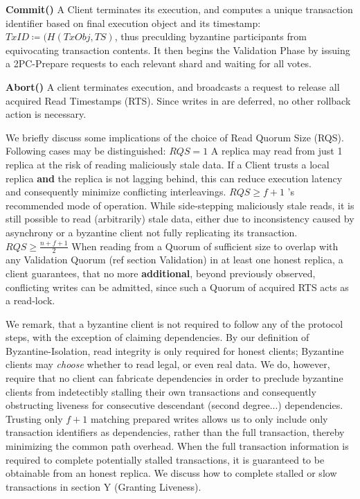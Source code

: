 \textbf{Commit()} A Client terminates its execution, and computes a unique transaction identifier based on final execution object and its timestamp: $TxID \coloneqq (H(TxObj, TS)$, thus preculding byzantine participants from equivocating transaction contents. It then begins the Validation Phase by issuing a 2PC-Prepare requests to each relevant shard and waiting for all votes.

\textbf{Abort()} A client terminates execution, and broadcasts a request to release all acquired Read Timestamps (RTS). Since writes in \sys are deferred, no other rollback action is necessary.


We briefly discuss some implications of the choice of Read Quorum Size (RQS). Following cases may be distinguished: \one \textbf{$RQS = 1$} A replica may read from just 1 replica at the risk of reading maliciously stale data. If a Client trusts a local replica \textbf{and} the replica is not lagging behind, this can reduce execution latency and consequently minimize conflicting interleavings. \two \textbf{$RQS \geq f+1$} \sys{}'s recommended mode of operation. While side-stepping maliciously stale reads, it is still possible to read (arbitrarily) stale data, either due to inconsistency caused by asynchrony or a byzantine client not fully replicating its transaction. 
\three \textbf{$RQS \geq \frac{n+f+1}{2}$} When reading from a Quorum of sufficient size to overlap with any Validation Quorum (ref section Validation) in at least one honest replica, a client guarantees, that no more \textbf{additional}, beyond previously observed, conflicting writes can be admitted, since such a Quorum of acquired RTS acts as a read-lock. 

We remark, that a byzantine client is not required to follow any of the protocol steps, with the exception of claiming dependencies. By our definition of Byzantine-Isolation, read integrity is only required for honest clients; Byzantine clients may \textit{choose} whether to read legal, or even real data. We do, however, require that no client can fabricate dependencies in order to preclude byzantine clients from indetectibly stalling their own transactions and consequently obstructing liveness for consecutive descendant (second degree...) dependencies.
Trusting only $f+1$ matching prepared writes allows us to only include only transaction identifiers as dependencies, rather than the full transaction, thereby minimizing the common path overhead. When the full transaction information is required to complete potentially stalled transactions, it is guaranteed to be obtainable from an honest replica. We discuss how to complete stalled or slow transactions in section Y (Granting Liveness).





